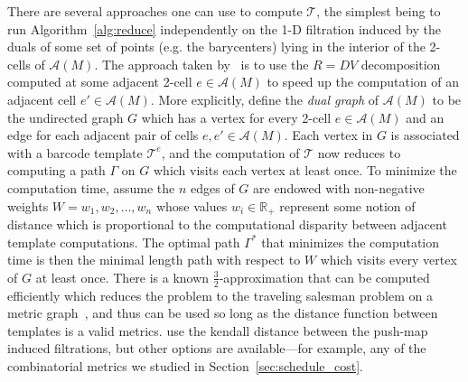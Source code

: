 \documentclass[sn-mathphys]{sn-jnl}
\begin{document}
There are several approaches one can use to compute $\mathcal{T}$, the simplest being to run Algorithm~\ref{alg:reduce} independently on the 1-D filtration induced by the duals of some set of points (e.g. the barycenters) lying in the interior of the 2-cells of $\mathcal{A}(M)$.  
The approach taken by~\cite{lesnick2015interactive} is to use the $R = DV$ decomposition computed at some adjacent 2-cell $e \in \mathcal{A}(M)$ to speed up the computation of an adjacent cell $e' \in \mathcal{A}(M)$. More explicitly, define the \emph{dual graph} of $\mathcal{A}(M)$ to be the undirected graph $G$ which has a vertex for every 2-cell $e \in \mathcal{A}(M)$ and an edge for each adjacent pair of cells $e, e' \in \mathcal{A}(M)$.
Each vertex in $G$ is associated with a barcode template $\mathcal{T}^e$, and the computation of $\mathcal{T}$ now reduces to computing a path $\Gamma$ on $G$ which visits each vertex at least once. To minimize the computation time, assume the $n$ edges of $G$ are endowed with non-negative weights $W = w_1, w_2, \dots, w_n$ whose values $w_i \in \mathbb{R}_{+}$ represent some notion of distance which is proportional to the computational disparity between adjacent template computations. The optimal path $\Gamma^\ast$ that minimizes the computation time is then the minimal length path with respect to $W$ which visits every vertex of $G$ at least once. There is a known $\frac{3}{2}$-approximation that can be computed efficiently which reduces the problem to the traveling salesman problem on a metric graph~\cite{christofides2022worst}, and thus can be used so long as the distance function between templates is a valid metrics. \cite{lesnick2012multidimensional} use the kendall distance between the push-map induced filtrations, but other options are available---for example, any of the combinatorial metrics we studied in Section~\ref{sec:schedule_cost}. 

\end{document}
